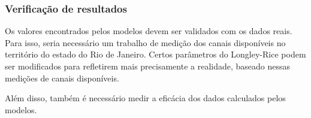 \subsubsection{Verificação de resultados}

Os valores encontrados pelos modelos devem ser validados com os dados reais. Para isso, seria necessário um trabalho de medição dos canais disponíveis no território do estado do Rio de Janeiro. Certos parâmetros do Longley-Rice podem ser modificados para refletirem mais precisamente a realidade, baseado nessas medições de canais disponíveis.

Além disso, também é necessário medir a eficácia dos dados calculados pelos modelos.












